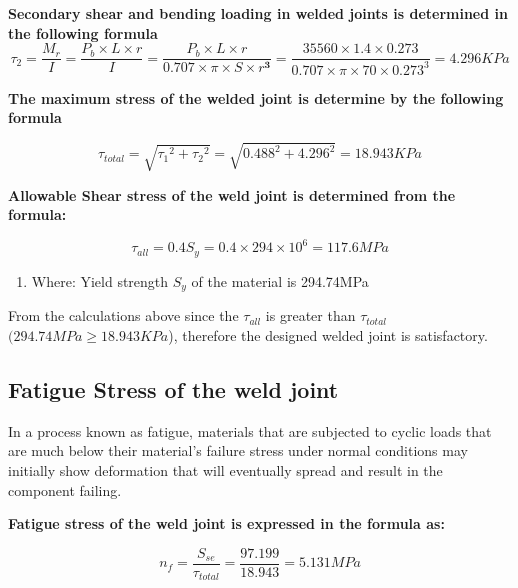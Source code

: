 {\textbf{Secondary shear and bending loading in welded joints is determined in the following formula}
\centering
\begin{equation}
\tau_2 = \frac{{M}_{r}}{{I}} =\frac{{P}_{{b} }\times{L}\times{r}}{{I}} = \frac{P_b \times L \times r} {0.707 \times{\pi}\times{S}\times{r}^\mathbf{3}} =\frac{35560 \times 1.4\times 0.273}{0.707 \times \pi \times 70 \times 0.273^3 } = 4.296KPa
\end{equation}


\textbf{The  maximum stress of the welded joint is determine by the following formula}

  \begin{equation}
    \tau_{total} =\sqrt{{\tau_1}^2+{\tau_2}^2} =\sqrt{{0.488}^2+{4.296}^2} = 18.943KPa
  \end{equation}
 

\textbf{Allowable Shear stress of the weld joint is determined from the formula:}

\begin{equation}
{\tau}_{{all}} = 0.4{S}_{y} =  0.4 \times 294 \times{10}^6 = 117.6MPa
\end{equation}

\begin{enumerate}[label={}]
\item Where: Yield strength \(S_y\) of the material is 294.74MPa
 \end{enumerate}
 
 From the calculations above since the \({\tau}_{{all}}\) is greater than  \({\tau}_{{total}}\) \((294.74MPa \geq 18.943KPa\)), therefore the designed welded joint is satisfactory.
 



 
\subsection{Fatigue Stress of the weld joint}

In a process known as fatigue, materials that are subjected to cyclic loads that are much below their material's failure stress under normal conditions may initially show deformation that will eventually spread and result in the component failing.

\textbf{Fatigue stress of the weld joint is expressed in the formula as:}

\begin{equation}
 {n}_{f}=\frac{{S}_{{se}}}{{\tau}_{{total}}} = \frac{{97}.{199}}{18.943} = 5.131MPa
\end{equation}


}

